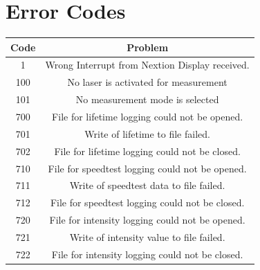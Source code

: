 	\section{Error Codes}
		\begin{tabular}{|c|c|}
			\hline 
			Code & Problem \\ 
			\hline 
			1 & Wrong Interrupt from Nextion Display received.\\
			\hline
			\hline
			100 & No laser is activated for measurement \\ 
			\hline 
			101 & No measurement mode is selected \\
			\hline
			\hline
			700 & File for lifetime logging could not be opened. \\ 
			\hline 
			701 & Write of lifetime to file failed.   \\ 
			\hline 
			702 & File for lifetime logging could not be closed. \\ 
			\hline 
			710 & File for speedtest logging could not be opened. \\ 
			\hline 
			711 & Write of speedtest data to file failed.   \\ 
			\hline 
			712 & File for speedtest logging could not be closed. \\ 
			\hline 		
			720 & File for intensity logging could not be opened. \\ 
			\hline 
			721 & Write of intensity value to file failed.   \\ 
			\hline 
			722 & File for intensity logging could not be closed. \\ 
			\hline 
		\end{tabular} 
	
		